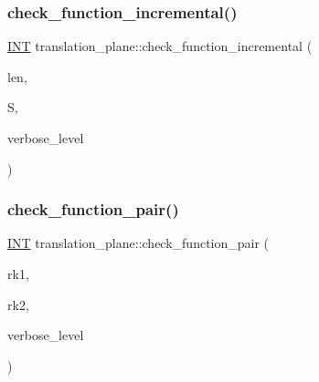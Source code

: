 \mbox{\label{classtranslation__plane_a87e4ca71ffbcfb34b99f18c6988cc421}} 
\subsubsection{\texorpdfstring{check\+\_\+function\+\_\+incremental()}{check\_function\_incremental()}}
{\footnotesize\ttfamily \mbox{\hyperlink{galois_8h_a09fddde158a3a20bd2dcadb609de11dc}{I\+NT}} translation\+\_\+plane\+::check\+\_\+function\+\_\+incremental (\begin{DoxyParamCaption}\item[{\mbox{\hyperlink{galois_8h_a09fddde158a3a20bd2dcadb609de11dc}{I\+NT}}}]{len,  }\item[{\mbox{\hyperlink{galois_8h_a09fddde158a3a20bd2dcadb609de11dc}{I\+NT}} $\ast$}]{S,  }\item[{\mbox{\hyperlink{galois_8h_a09fddde158a3a20bd2dcadb609de11dc}{I\+NT}}}]{verbose\+\_\+level }\end{DoxyParamCaption})}

\mbox{\label{classtranslation__plane_ad7d5c79559e35323df6072dda8b1b5e4}} 
\subsubsection{\texorpdfstring{check\+\_\+function\+\_\+pair()}{check\_function\_pair()}}
{\footnotesize\ttfamily \mbox{\hyperlink{galois_8h_a09fddde158a3a20bd2dcadb609de11dc}{I\+NT}} translation\+\_\+plane\+::check\+\_\+function\+\_\+pair (\begin{DoxyParamCaption}\item[{\mbox{\hyperlink{galois_8h_a09fddde158a3a20bd2dcadb609de11dc}{I\+NT}}}]{rk1,  }\item[{\mbox{\hyperlink{galois_8h_a09fddde158a3a20bd2dcadb609de11dc}{I\+NT}}}]{rk2,  }\item[{\mbox{\hyperlink{galois_8h_a09fddde158a3a20bd2dcadb609de11dc}{I\+NT}}}]{verbose\+\_\+level }\end{DoxyParamCaption})}

